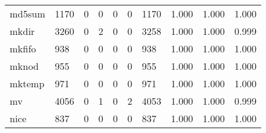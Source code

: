 \begin{longtable}{lp{1.3cm}p{1.3cm}p{1.3cm}p{1.3cm}p{1.3cm}p{1.3cm}p{1.3cm}p{1.3cm}p{1.3cm}}
md5sum    &                   1170 &                                  0 &                                 0 &                                0 &                                 0 &                            1170 &                                   1.000 &                                  1.000 &                                1.000 \\
mkdir     &                   3260 &                                  0 &                                 2 &                                0 &                                 0 &                            3258 &                                   1.000 &                                  1.000 &                                0.999 \\
mkfifo    &                    938 &                                  0 &                                 0 &                                0 &                                 0 &                             938 &                                   1.000 &                                  1.000 &                                1.000 \\
mknod     &                    955 &                                  0 &                                 0 &                                0 &                                 0 &                             955 &                                   1.000 &                                  1.000 &                                1.000 \\
mktemp    &                    971 &                                  0 &                                 0 &                                0 &                                 0 &                             971 &                                   1.000 &                                  1.000 &                                1.000 \\
mv        &                   4056 &                                  0 &                                 1 &                                0 &                                 2 &                            4053 &                                   1.000 &                                  1.000 &                                0.999 \\
nice      &                    837 &                                  0 &                                 0 &                                0 &                                 0 &                             837 &                                   1.000 &                                  1.000 &                                1.000 \\

\end{longtable}
